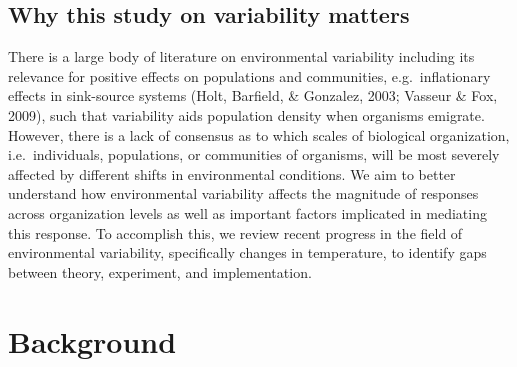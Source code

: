 \documentclass[12pt,twoside]{reedthesis}
\begin{document}
\hypertarget{why-this-study-on-variability-matters}{%
\section{Why this study on variability matters}\label{why-this-study-on-variability-matters}}

There is a large body of literature on environmental variability including its relevance for positive effects on populations and communities, e.g.~inflationary effects in sink-source systems (Holt, Barfield, \& Gonzalez, 2003; Vasseur \& Fox, 2009), such that variability aids population density when organisms emigrate. However, there is a lack of consensus as to which scales of biological organization, i.e.~individuals, populations, or communities of organisms, will be most severely affected by different shifts in environmental conditions. We aim to better understand how environmental variability affects the magnitude of responses across organization levels as well as important factors implicated in mediating this response. To accomplish this, we review recent progress in the field of environmental variability, specifically changes in temperature, to identify gaps between theory, experiment, and implementation.

\hypertarget{background}{%
\chapter{Background}\label{background}}
\end{document}
